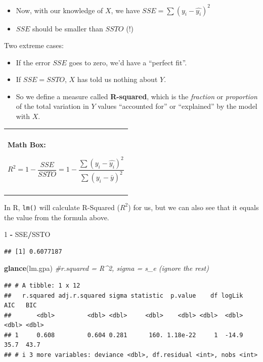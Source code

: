 \documentclass[
]{book}
\newenvironment{Shaded}{\begin{snugshade}}{\end{snugshade}}
\newcommand{\CommentTok}[1]{\textcolor[rgb]{0.56,0.35,0.01}{\textit{#1}}}
\newcommand{\DecValTok}[1]{\textcolor[rgb]{0.00,0.00,0.81}{#1}}
\newcommand{\FunctionTok}[1]{\textcolor[rgb]{0.13,0.29,0.53}{\textbf{#1}}}
\newcommand{\NormalTok}[1]{#1}
\newcommand{\SpecialCharTok}[1]{\textcolor[rgb]{0.81,0.36,0.00}{\textbf{#1}}}
\newenvironment{mathbox}
{
    \begin{center}
    
    \begin{tabular}{|p{0.8\textwidth}|}
    \rowcolor{LightYellow}
    \hline\\
    \rowcolor{LightYellow}
    \textbf{Math Box:}
}
{
    \\\rowcolor{LightYellow}
    \\\hline
    \end{tabular} 
    \end{center}
}
\begin{document}
\begin{itemize}
\item
  Now, with our knowledge of \(X\), we have \(SSE = \sum{(y_i - \hat{y_i})^2}\)
\item
  \(SSE\) should be smaller than \(SSTO\) (!)
\end{itemize}

Two extreme cases:

\begin{itemize}
\item
  If the error \(SSE\) goes to zero, we'd have a ``perfect fit''.
\item
  If \(SSE = SSTO\), \(X\) has told us nothing about \(Y\).
\item
  So we define a measure called \textbf{R-squared}, which is the \emph{fraction} or \emph{proportion} of the total variation in \(Y\) values ``accounted for'' or ``explained'' by the model with \(X\).
\end{itemize}

\begin{mathbox}
\[ R^2 = 1 - \frac{SSE}{SSTO} = 1 - \frac{ \sum{(y_i - \hat{y_i})^2}}{ \sum{(y_i - \bar{y})^2}}\]
\end{mathbox}

In R, \texttt{lm()} will calculate R-Squared (\(R^2\)) for us, but we can also see that it equals the value from the formula above.

\begin{Shaded}
\begin{Highlighting}[]
\DecValTok{1} \SpecialCharTok{{-}}\NormalTok{ SSE}\SpecialCharTok{/}\NormalTok{SSTO}
\end{Highlighting}
\end{Shaded}

\begin{verbatim}
## [1] 0.6077187
\end{verbatim}

\begin{Shaded}
\begin{Highlighting}[]
\FunctionTok{glance}\NormalTok{(lm.gpa) }\CommentTok{\#r.squared = R\^{}2, sigma = s\_e (ignore the rest)}
\end{Highlighting}
\end{Shaded}

\begin{verbatim}
## # A tibble: 1 x 12
##   r.squared adj.r.squared sigma statistic  p.value    df logLik   AIC   BIC
##       <dbl>         <dbl> <dbl>     <dbl>    <dbl> <dbl>  <dbl> <dbl> <dbl>
## 1     0.608         0.604 0.281      160. 1.18e-22     1  -14.9  35.7  43.7
## # i 3 more variables: deviance <dbl>, df.residual <int>, nobs <int>
\end{verbatim}
\end{document}
